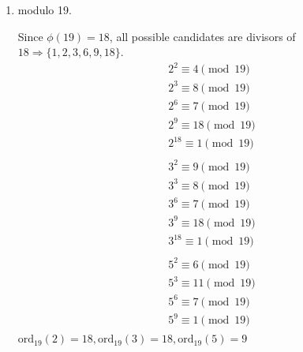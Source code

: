 \documentclass[12pt]{exam}
\theoremstyle{definition}
\begin{document}
\begin{enumerate}
\begin{enumerate}
                  \item modulo 19.
                  \begin{answer}
                        Since $\phi(19) = 18$, all possible candidates are divisors 
                        of\newline $18 \Rightarrow \{1, 2, 3, 6, 9, 18\}$.
                        \[
                              \begin{aligned}
                                    &2^2 \equiv 4 \pmod {19}\\
                                    &2^3 \equiv 8 \pmod {19}\\
                                    &2^6 \equiv 7 \pmod {19}\\
                                    &2^9 \equiv 18 \pmod {19}\\
                                    &2^{18} \equiv 1 \pmod {19}\\
                              \end{aligned}
                        \]
                        \[
                              \begin{aligned}
                                    &3^2 \equiv 9 \pmod {19}\\
                                    &3^3 \equiv 8 \pmod {19}\\
                                    &3^6 \equiv 7 \pmod {19}\\
                                    &3^9 \equiv 18 \pmod {19}\\
                                    &3^{18} \equiv 1 \pmod {19}\\
                              \end{aligned}
                        \]
                        \[
                              \begin{aligned}
                                    &5^2 \equiv 6 \pmod {19}\\
                                    &5^3 \equiv 11 \pmod {19}\\
                                    &5^6 \equiv 7 \pmod {19}\\
                                    &5^9 \equiv 1 \pmod {19}\\
                              \end{aligned}
                        \]
                        $\text{ord}_{19}(2) = 18, \text{ord}_{19}(3) = 18, \text{ord}_{19}(5) = 9$
                  \end{answer}


\end{enumerate}
\end{enumerate}
\end{document}
